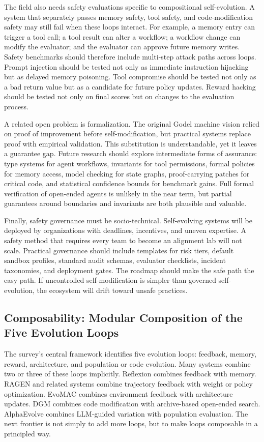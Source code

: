 The field also needs safety evaluations specific to compositional self-evolution. A system that separately passes memory safety, tool safety, and code-modification safety may still fail when these loops interact. For example, a memory entry can trigger a tool call; a tool result can alter a workflow; a workflow change can modify the evaluator; and the evaluator can approve future memory writes. Safety benchmarks should therefore include multi-step attack paths across loops. Prompt injection should be tested not only as immediate instruction hijacking but as delayed memory poisoning. Tool compromise should be tested not only as a bad return value but as a candidate for future policy updates. Reward hacking should be tested not only on final scores but on changes to the evaluation process.

A related open problem is formalization. The original Godel machine vision relied on proof of improvement before self-modification, but practical systems replace proof with empirical validation. This substitution is understandable, yet it leaves a guarantee gap. Future research should explore intermediate forms of assurance: type systems for agent workflows, invariants for tool permissions, formal policies for memory access, model checking for state graphs, proof-carrying patches for critical code, and statistical confidence bounds for benchmark gains. Full formal verification of open-ended agents is unlikely in the near term, but partial guarantees around boundaries and invariants are both plausible and valuable.

Finally, safety governance must be socio-technical. Self-evolving systems will be deployed by organizations with deadlines, incentives, and uneven expertise. A safety method that requires every team to become an alignment lab will not scale. Practical governance should include templates for risk tiers, default sandbox profiles, standard audit schemas, evaluator checklists, incident taxonomies, and deployment gates. The roadmap should make the safe path the easy path. If uncontrolled self-modification is simpler than governed self-evolution, the ecosystem will drift toward unsafe practices.

\subsection{Composability: Modular Composition of the Five Evolution Loops}
\label{subsec:composability}

The survey's central framework identifies five evolution loops: feedback, memory, reward, architecture, and population or code evolution. Many systems combine two or three of these loops implicitly. Reflexion combines feedback with memory. RAGEN and related systems combine trajectory feedback with weight or policy optimization. EvoMAC combines environment feedback with architecture updates. DGM combines code modification with archive-based open-ended search. AlphaEvolve combines LLM-guided variation with population evaluation. The next frontier is not simply to add more loops, but to make loops composable in a principled way.

